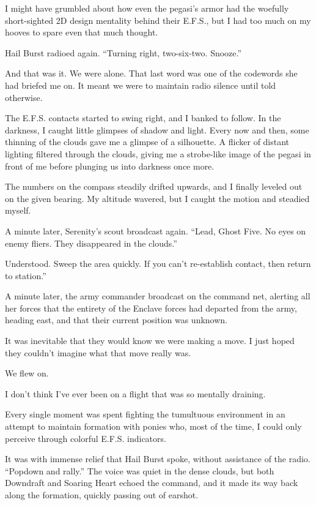 I might have grumbled about how even the pegasi’s armor had the woefully short-sighted 2D design mentality behind their E.F.S., but I had too much on my hooves to spare even that much thought.

Hail Burst radioed again. “Turning right, two-six-two. Snooze.”

And that was it. We were alone. That last word was one of the codewords she had briefed me on. It meant we were to maintain radio silence until told otherwise.

The E.F.S. contacts started to swing right, and I banked to follow. In the darkness, I caught little glimpses of shadow and light. Every now and then, some thinning of the clouds gave me a glimpse of a silhouette. A flicker of distant lighting filtered through the clouds, giving me a strobe-like image of the pegasi in front of me before plunging us into darkness once more.

The numbers on the compass steadily drifted upwards, and I finally leveled out on the given bearing. My altitude wavered, but I caught the motion and steadied myself.

A minute later, Serenity’s scout broadcast again. “Lead, Ghost Five. No eyes on enemy fliers. They disappeared in the clouds.”

\leavevmode{}Understood. Sweep the area quickly. If you can’t re-establish contact, then return to station.”

A minute later, the army commander broadcast on the command net, alerting all her forces that the entirety of the Enclave forces had departed from the army, heading east, and that their current position was unknown.

It was inevitable that they would know we were making a move. I just hoped they couldn’t imagine what that move really was.

We flew on.

{\br}%
I don’t think I’ve ever been on a flight that was so mentally draining.

Every single moment was spent fighting the tumultuous environment in an attempt to maintain formation with ponies who, most of the time, I could only perceive through colorful E.F.S. indicators.

It was with immense relief that Hail Burst spoke, without assistance of the radio. “Popdown and rally.” The voice was quiet in the dense clouds, but both Downdraft and Soaring Heart echoed the command, and it made its way back along the formation, quickly passing out of earshot.

